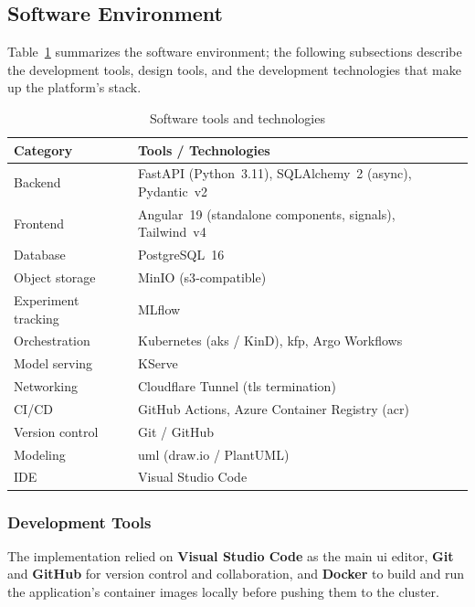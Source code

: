 \subsection{Software Environment}
Table~\ref{tab:software} summarizes the software environment; the following
subsections describe the development tools, design tools, and the development
technologies that make up the platform's stack.

\begin{table}[H]\centering
\renewcommand{\arraystretch}{1.3}
\caption{Software tools and technologies}\label{tab:software}
\begin{tabularx}{\textwidth}{|>{\raggedright\arraybackslash}p{4.2cm}|X|}
\hline
\textbf{Category} & \textbf{Tools / Technologies}\\
\hline
Backend             & FastAPI (Python~3.11), SQLAlchemy~2 (async), Pydantic~v2\\
\hline
Frontend            & Angular~19 (standalone components, signals), Tailwind~v4\\
\hline
Database            & PostgreSQL~16\\
\hline
Object storage      & MinIO (\gls{s3}-compatible)\\
\hline
Experiment tracking & MLflow\\
\hline
Orchestration       & Kubernetes (\gls{aks} / KinD), \gls{kfp}, Argo Workflows\\
\hline
Model serving       & KServe\\
\hline
Networking          & Cloudflare Tunnel (\gls{tls} termination)\\
\hline
CI/CD               & GitHub Actions, Azure Container Registry (\gls{acr})\\
\hline
Version control     & Git / GitHub\\
\hline
Modeling            & \gls{uml} (draw.io / PlantUML)\\
\hline
IDE                 & Visual Studio Code\\
\hline
\end{tabularx}
\end{table}

\subsubsection{Development Tools}
The implementation relied on \textbf{Visual Studio Code} as the main \gls{ui}
editor, \textbf{Git} and \textbf{GitHub} for version control and collaboration,
and \textbf{Docker} to build and run the application's container images locally
before pushing them to the cluster.

